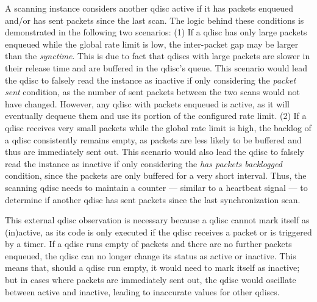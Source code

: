 A scanning instance considers another qdisc active if it has packets enqueued and/or has sent packets since the last scan.
%
The logic behind these conditions is demonstrated in the following two scenarios:
%
(1) If a qdisc has only large packets enqueued while the global rate limit is low, the inter-packet gap may be larger than the \textit{synctime}.
This is due to fact that qdiscs with large packets are slower in their release time and are buffered in the qdisc's queue.
%
This scenario would lead the qdisc to falsely read the instance as inactive if only considering the \textit{packet sent} condition, as the number of sent packets between the two scans  would not have changed.
%
However, any qdisc with packets enqueued is active, as it will eventually dequeue them and use its portion of the configured rate limit.
%
(2) If a qdisc receives very small packets while the global rate limit is high, the backlog of a qdisc consistently remains empty, as packets are less likely to be buffered and thus are immediately sent out.
%
This scenario would also lead the qdisc to falsely read the instance as inactive if only considering the \textit{has packets backlogged} condition, since the packets are only buffered for a very short interval.
%
Thus, the scanning qdisc needs to maintain a counter --- similar to a heartbeat signal --- to determine if another qdisc has sent packets since the last synchronization scan.
%

This external qdisc observation is necessary because a qdisc cannot mark itself as (in)active, as its code is only executed if the qdisc receives a packet or is triggered by a timer.
%
If a qdisc runs empty of packets and there are no further packets enqueued, the qdisc can no longer change its status as active or inactive.
%
This means that, should a qdisc run empty, it would need to mark itself as inactive; but in cases where packets are immediately sent out, the qdisc would oscillate
between active and inactive, leading to inaccurate values for other qdiscs. 
%

